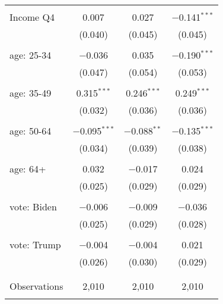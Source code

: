 \begin{tabular}{@{\extracolsep{5pt}}lccc}
  & & & \\ 
 Income Q4 & 0.007 & 0.027 & $-$0.141$^{***}$ \\ 
  & (0.040) & (0.045) & (0.045) \\ 
  & & & \\ 
 age: 25-34 & $-$0.036 & 0.035 & $-$0.190$^{***}$ \\ 
  & (0.047) & (0.054) & (0.053) \\ 
  & & & \\ 
 age: 35-49 & 0.315$^{***}$ & 0.246$^{***}$ & 0.249$^{***}$ \\ 
  & (0.032) & (0.036) & (0.036) \\ 
  & & & \\ 
 age: 50-64 & $-$0.095$^{***}$ & $-$0.088$^{**}$ & $-$0.135$^{***}$ \\ 
  & (0.034) & (0.039) & (0.038) \\ 
  & & & \\ 
 age: 64+ & 0.032 & $-$0.017 & 0.024 \\ 
  & (0.025) & (0.029) & (0.029) \\ 
  & & & \\ 
 vote: Biden & $-$0.006 & $-$0.009 & $-$0.036 \\ 
  & (0.025) & (0.029) & (0.028) \\ 
  & & & \\ 
 vote: Trump & $-$0.004 & $-$0.004 & 0.021 \\ 
  & (0.026) & (0.030) & (0.029) \\ 
  & & & \\ 
\hline \\[-1.8ex] 

Observations & 2,010 & 2,010 & 2,010 \\ 
\hline 
\hline \\[-1.8ex] 
\end{tabular} 